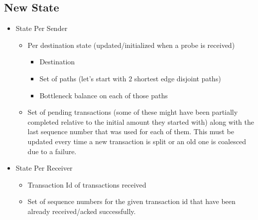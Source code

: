 \documentclass[a4paper]{article}
\begin{document}
\subsection{New State}
\begin{itemize}
    \item State Per Sender
        \begin{itemize}
            \item Per destination state (updated/initialized when a probe is received)
                \begin{itemize}
                    \item Destination
                    \item Set of paths (let's start with $2$ shortest edge disjoint paths)
                    \item Bottleneck balance on each of those paths
                \end{itemize}
            \item Set of pending transactions (some of these might have been partially completed relative to the initial amount they started with) along with the last sequence
                number that was used for each of them. This must be updated every time a new transaction is split or an old one is coalesced due to a failure.
        \end{itemize}
    
    \item State Per Receiver
        \begin{itemize}
            \item Transaction Id of transactions received
            \item Set of sequence numbers for the given transaction id that have been already received/acked successfully.
        \end{itemize}

\end{itemize}
\end{document}
